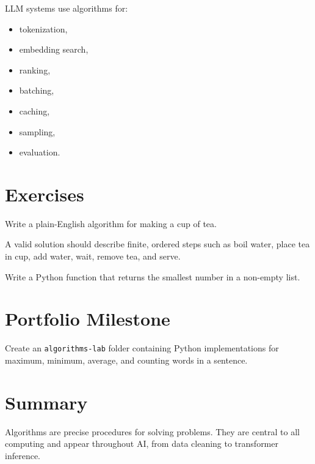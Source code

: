 LLM systems use algorithms for:

\begin{itemize}
    \item tokenization,
    \item embedding search,
    \item ranking,
    \item batching,
    \item caching,
    \item sampling,
    \item evaluation.
\end{itemize}

\section{Exercises}

\begin{exercise}
Write a plain-English algorithm for making a cup of tea.
\end{exercise}

\begin{solution}
A valid solution should describe finite, ordered steps such as boil water, place tea in cup, add water, wait, remove tea, and serve.
\end{solution}

\begin{exercise}
Write a Python function that returns the smallest number in a non-empty list.
\end{exercise}

\section{Portfolio Milestone}

Create an \texttt{algorithms-lab} folder containing Python implementations for maximum, minimum, average, and counting words in a sentence.

\section{Summary}

Algorithms are precise procedures for solving problems. They are central to all computing and appear throughout AI, from data cleaning to transformer inference.
